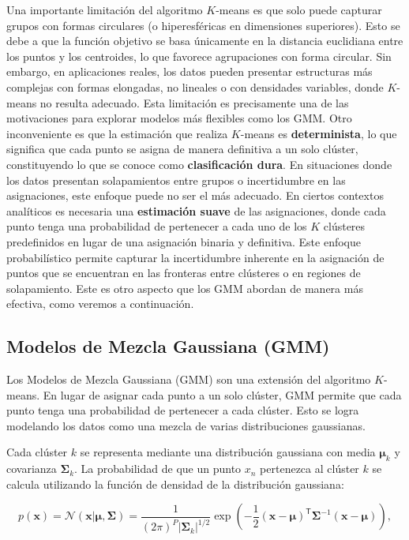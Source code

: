 Una importante limitación del algoritmo \(K\)-means es que solo puede capturar grupos con formas circulares (o hiperesféricas en dimensiones superiores). Esto se debe a que la función objetivo se basa únicamente en la distancia euclidiana entre los puntos y los centroides, lo que favorece agrupaciones con forma circular. Sin embargo, en aplicaciones reales, los datos pueden presentar estructuras más complejas con formas elongadas, no lineales o con densidades variables, donde \(K\)-means no resulta adecuado. Esta limitación es precisamente una de las motivaciones para explorar modelos más flexibles como los GMM. Otro inconveniente es que la estimación que realiza \(K\)-means es \textbf{determinista}, lo que significa que cada punto se asigna de manera definitiva a un solo clúster, constituyendo lo que se conoce como \textbf{clasificación dura}. En situaciones donde los datos presentan solapamientos entre grupos o incertidumbre en las asignaciones, este enfoque puede no ser el más adecuado. En ciertos contextos analíticos es necesaria una \textbf{estimación suave} de las asignaciones, donde cada punto tenga una probabilidad de pertenecer a cada uno de los \(K\) clústeres predefinidos en lugar de una asignación binaria y definitiva. Este enfoque probabilístico permite capturar la incertidumbre inherente en la asignación de puntos que se encuentran en las fronteras entre clústeres o en regiones de solapamiento. Este es otro aspecto que los GMM abordan de manera más efectiva, como veremos a continuación.

\subsection{Modelos de Mezcla Gaussiana (GMM)}

Los Modelos de Mezcla Gaussiana (GMM) son una extensión del algoritmo \(K\)-means. En lugar de asignar cada punto a un solo clúster, GMM permite que cada punto tenga una probabilidad de pertenecer a cada clúster. Esto se logra modelando los datos como una mezcla de varias distribuciones gaussianas.

Cada clúster \(k\) se representa mediante una distribución gaussiana con media \(\boldsymbol{\mu}_k\) y covarianza \(\boldsymbol{\Sigma}_k\). La probabilidad de que un punto \(x_n\) pertenezca al clúster \(k\) se calcula utilizando la función de densidad de la distribución gaussiana:

\[
p(\boldsymbol{x}) = \mathcal{N}(\boldsymbol{x} | \boldsymbol{\mu}, \boldsymbol{\Sigma}
)=\frac{1}{(2\pi)^{P} |\boldsymbol{\Sigma}_k|^{1/2}} \exp\left(-\frac{1}{2} (\boldsymbol{x} - \boldsymbol{\mu})^\mathsf{T} \boldsymbol{\Sigma}^{-1} (\boldsymbol{x} - \boldsymbol{\mu})\right),
\]



